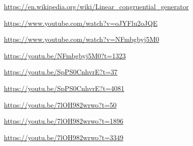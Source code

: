\documentclass[12pt]{mwrep}
\begin{document}
	
	\begin{thebibliography}{1}
		\url{https://en.wikipedia.org/wiki/Linear_congruential_generator}
		
		\url{https://www.youtube.com/watch?v=oJYFlu2oJQE}
		
		\url{https://www.youtube.com/watch?v=NFmbgbyj5M0}
		
		\url{https://youtu.be/NFmbgbyj5M0?t=1323}
		
		\url{https://youtu.be/SpPS0CnhvrE?t=37}
		
		\url{https://youtu.be/SpPS0CnhvrE?t=4081}
		
		\url{https://youtu.be/7lOH982wrwo?t=50}
		
		\url{https://youtu.be/7lOH982wrwo?t=1896}
		
		\url{https://youtu.be/7lOH982wrwo?t=3349}

	\end{thebibliography}
	
\end{document}
